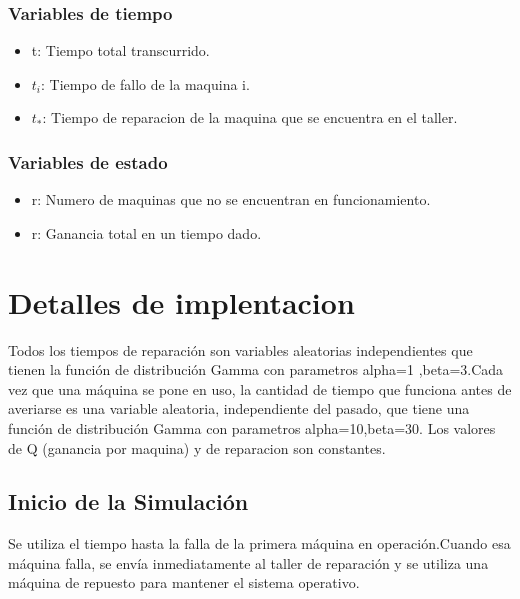 \documentclass[a4paper,12pt]{article}
\begin{document}
		\subsubsection{Variables de tiempo}
		\begin{itemize}
			\item t: Tiempo total transcurrido.
			\item $t_i$: Tiempo de fallo de la maquina i.
			\item $t_*$: Tiempo de reparacion de la maquina que se encuentra en el taller.
			
		\end{itemize}
		\subsubsection{Variables de estado}
		\begin{itemize}
			\item r: Numero de maquinas que no se encuentran en funcionamiento.
			\item r: Ganancia total en un tiempo dado.
		\end{itemize}
	
	\section{Detalles de implentacion}
	  Todos los tiempos de reparación son variables aleatorias independientes que tienen la función de distribución Gamma con parametros alpha=1 ,beta=3.Cada vez que una máquina se pone en uso, la cantidad de tiempo que funciona antes de averiarse es una variable aleatoria, independiente del pasado, que tiene una función de distribución Gamma con parametros alpha=10,beta=30. Los valores de Q (ganancia por maquina) y de reparacion son constantes.
	
			\subsection{Inicio de la Simulación}
			Se utiliza el tiempo hasta la falla de la primera máquina en operación.Cuando esa máquina falla, se envía inmediatamente al taller de reparación y se utiliza una máquina de repuesto para mantener el sistema operativo.
\end{document}
